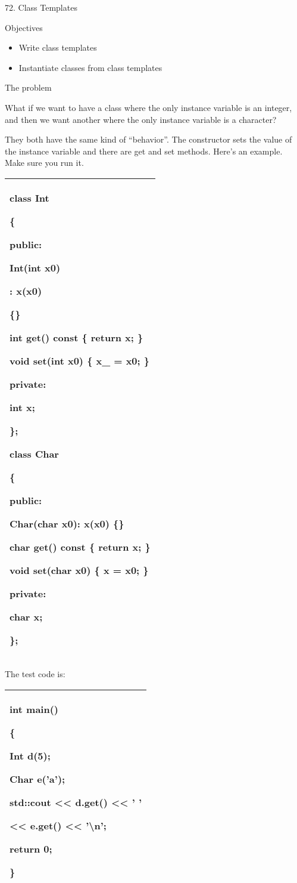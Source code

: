 \documentclass[
]{article}
\author{}
\date{}
\providecommand{\tightlist}{%
  \setlength{\itemsep}{0pt}\setlength{\parskip}{0pt}}
\begin{document}
72. Class Templates

Objectives

\begin{itemize}
\tightlist
\item
  Write class templates
\item
  Instantiate classes from class templates
\end{itemize}

The problem

What if we want to have a class where the only instance variable is an
integer, and then we want another where the only instance variable is a
character?

They both have the same kind of ``behavior''. The constructor sets the
value of the instance variable and there are get and set methods. Here's
an example. Make sure you run it.

\begin{longtable}[]{@{}l@{}}
\toprule
\endhead
\begin{minipage}[t]{0.97\columnwidth}\raggedright
class Int

\{

public:

Int(int x0)

: x(x0)

\{\}

int get() const \{ return x; \}

void set(int x0) \{ x\_ = x0; \}

private:

int x;

\};

class Char

\{

public:

Char(char x0): x(x0) \{\}

char get() const \{ return x; \}

void set(char x0) \{ x = x0; \}

private:

char x;

\};\strut
\end{minipage}\tabularnewline
\bottomrule
\end{longtable}

The test code is:

\begin{longtable}[]{@{}l@{}}
\toprule
\endhead
\begin{minipage}[t]{0.97\columnwidth}\raggedright
int main()

\{

Int d(5);

Char e('a');

std::cout \textless\textless{} d.get() \textless\textless{} ' '

\textless\textless{} e.get() \textless\textless{} '\textbackslash n';

return 0;

\}\strut
\end{minipage}\tabularnewline
\bottomrule
\end{longtable}
\end{document}
